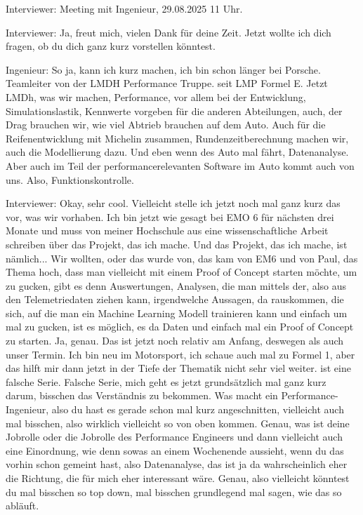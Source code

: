\label{transkript-meeting1}

\linenumbers

Interviewer: 
Meeting mit Ingenieur, 29.08.2025 11 Uhr. 


Interviewer: 
Ja, freut mich, vielen Dank für deine Zeit.  
Jetzt wollte ich dich fragen, ob du dich ganz kurz vorstellen könntest.  

Ingenieur: 
So ja, kann ich kurz machen, ich bin schon länger bei Porsche.   Teamleiter  von der LMDH Performance Truppe.   seit LMP Formel E. Jetzt LMDh, was wir machen, Performance, vor  allem bei der Entwicklung, Simulationslastik, Kennwerte vorgeben für die anderen Abteilungen, auch, der Drag brauchen wir, wie viel Abtrieb brauchen auf dem Auto.    Auch für die Reifenentwicklung mit Michelin zusammen, Rundenzeitberechnung machen wir, auch die Modellierung dazu. Und eben wenn des Auto mal fährt, Datenanalyse. Aber auch im Teil der performancerelevanten Software im Auto kommt auch von uns. Also, Funktionskontrolle. 

Interviewer: 
Okay, sehr cool. Vielleicht stelle ich jetzt noch mal ganz kurz das vor, was wir vorhaben. Ich bin jetzt wie gesagt bei EMO 6 für nächsten drei Monate und muss von meiner Hochschule aus eine wissenschaftliche Arbeit schreiben über das Projekt, das ich mache. Und das Projekt, das ich mache, ist nämlich...  Wir wollten, oder das wurde von, das kam von EM6 und von Paul, das Thema hoch, dass man vielleicht mit einem Proof of Concept starten möchte, um zu gucken, gibt es denn Auswertungen, Analysen, die man mittels der, also aus den Telemetriedaten ziehen kann, irgendwelche Aussagen, da rauskommen, die sich, auf die man ein Machine Learning Modell trainieren kann und einfach um mal zu gucken, ist es möglich, es da  Daten und einfach mal ein Proof of Concept zu starten.  Ja, genau. Das ist jetzt noch relativ am Anfang, deswegen als auch unser Termin. Ich bin neu im Motorsport, ich  schaue auch mal zu Formel 1, aber das hilft mir dann jetzt in der Tiefe der Thematik nicht sehr viel weiter. ist eine falsche Serie. Falsche Serie, mich geht es jetzt grundsätzlich mal ganz kurz darum, bisschen das Verständnis zu bekommen. Was  macht ein Performance-Ingenieur, also du hast es gerade schon mal kurz angeschnitten, vielleicht auch mal bisschen, also wirklich vielleicht so von oben kommen.  Genau,  was ist deine Jobrolle oder die Jobrolle des Performance Engineers und dann vielleicht auch eine Einordnung, wie denn sowas an einem Wochenende aussieht, wenn du das vorhin schon gemeint hast, also Datenanalyse, das ist ja da wahrscheinlich eher die Richtung, die für mich eher interessant wäre. Genau, also vielleicht könntest du mal bisschen so top down, mal bisschen grundlegend mal sagen, wie das so abläuft.  


